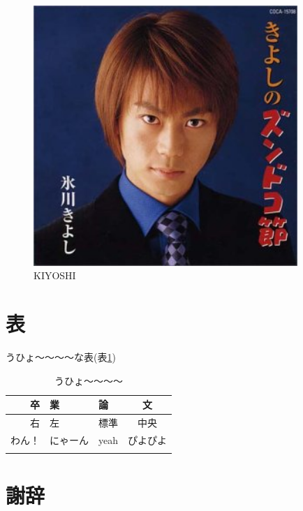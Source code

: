 \begin{figure}[h]
    \centering
    \includegraphics[width=10cm,height=\textheight]{images/kiyoshi.jpg}
    \caption{KIYOSHI\label{kiyoshi}}
    \label{fig:kiyoshi.jpg}
\end{figure}

\section{表}

うひょ〜〜〜〜な表(表\ref{uhyo})

\begin{longtable}[]{@{}rllc@{}}
    \tabularnewline
    \toprule
    卒 & 業 & 論 & 文
    \tabularnewline
    \midrule
    \endfirsthead
    右 & 左 & 標準 & 中央
    \tabularnewline
    わん！ & にゃーん & yeah & ぴよぴよ
    \tabularnewline
    \bottomrule
    
    \caption{うひょ〜〜〜〜\label{uhyo}}
\end{longtable}

\section*{謝辞}
